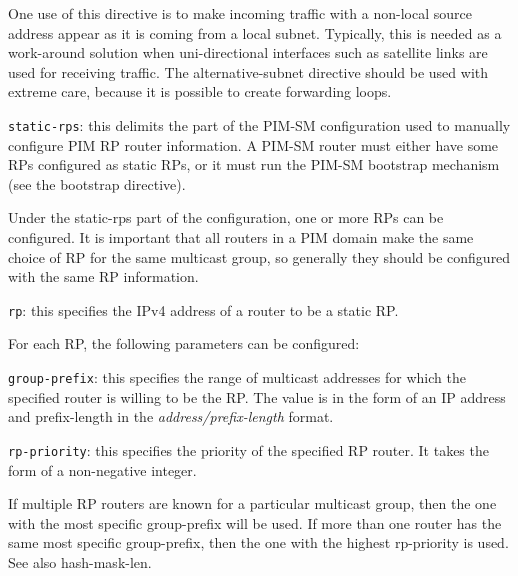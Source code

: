 \begin{description}
\begin{description}
  One use of this directive is to make incoming traffic with a
  non-local source address appear as it is coming from a local
  subnet. Typically, this is needed as a work-around solution when
  uni-directional interfaces such as satellite links are used for
  receiving traffic.  The {\stt alternative-subnet} directive should be
  used with extreme care, because it is possible to create forwarding
  loops.
\end{description}
\item{\tt static-rps}: this delimits the part of the PIM-SM
  configuration used to manually configure PIM RP router information.
  A PIM-SM router must either have some RPs configured as static RPs,
  or it must run the PIM-SM bootstrap mechanism (see the {\stt
  bootstrap} directive).  

  Under the {\stt static-rps} part of the configuration, one or more
  RPs can be configured.  It is important that all routers in a PIM
  domain make the same choice of RP for the same multicast group, so
  generally they should be configured with the same RP information.
\begin{description}
\item{\tt rp}: this specifies the IPv4 address of a router to be a
  static RP.  

  For each RP, the following parameters can be configured:
\begin{description}
\item{\tt group-prefix}: this specifies the range of multicast
  addresses for which the specified router is willing to be the RP.
  The value is in the form of an IP address and prefix-length in the
  {\it address/prefix-length} format.
\begin{description}
\item{\tt rp-priority}: this specifies the priority of the specified
  RP router.  It takes the form of a non-negative integer. 

  If multiple RP routers are known for a particular multicast group,
  then the one with the most specific {\stt group-prefix} will be
  used.  If more than one router has the same most specific {\stt
  group-prefix}, then the one with the highest {\stt rp-priority} is
  used.  See also {\stt hash-mask-len}.


\end{description}
\end{description}
\end{description}
\end{description}
